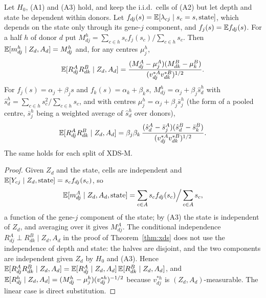 \begin{lemma}\label{lem:coupling}
Let $H_0$, (A1) and (A3) hold, and keep the i.i.d.\ cells of (A2) but let depth and state be dependent within donors. Let $f_{dj}(s)=\mathbb{E}[\lambda_{cj}\mid s_c=s,\text{state}]$, which depends on the state only through its gene-$j$ component, and $f_j(s)=\mathbb{E} f_{dj}(s)$. For a half $h$ of donor $d$ put $M^h_{dj}=\sum_{c\in h}s_cf_j(s_c)/\sum_{c\in h}s_c$. Then $\mathbb{E}[m^h_{dj}\mid Z_d,A_d]=M^h_{dj}$ and, for any centres $\mu^h_j$,
\[\mathbb{E}[R^A_{dj}R^B_{dk}\mid Z_d,A_d]=\frac{(M^A_{dj}-\mu^A_j)(M^B_{dk}-\mu^B_k)}{(v^{*A}_{dj}v^{*B}_{dk})^{1/2}}.\]
For $f_j(s)=\alpha_j+\beta_js$ and $f_k(s)=\alpha_k+\beta_ks$, $M^h_{dj}=\alpha_j+\beta_j\hat s^h_d$ with $\hat s^h_d=\sum_{c\in h}s_c^2/\sum_{c\in h}s_c$, and with centres $\mu^h_j=\alpha_j+\beta_j\bar s^h_j$ (the form of a pooled centre, $\bar s^h_j$ being a weighted average of $\hat s^h_d$ over donors),
\[\mathbb{E}[R^A_{dj}R^B_{dk}\mid Z_d,A_d]=\beta_j\beta_k\,\frac{(\hat s^A_d-\bar s^A_j)(\hat s^B_d-\bar s^B_k)}{(v^{*A}_{dj}v^{*B}_{dk})^{1/2}}.\]
The same holds for each split of XDS-M.
\end{lemma}
\begin{proof}
Given $Z_d$ and the state, cells are independent and $\mathbb{E}[Y_{cj}\mid Z_d,\text{state}]=s_cf_{dj}(s_c)$, so
\[\mathbb{E}[m^A_{dj}\mid Z_d,A_d,\text{state}]=\sum_{c\in A}s_cf_{dj}(s_c)\Big/\sum_{c\in A}s_c,\]
a function of the gene-$j$ component of the state; by (A3) the state is independent of $Z_d$, and averaging over it gives $M^A_{dj}$. The conditional independence $R^A_{dj}\perp R^B_{dk}\mid Z_d,A_d$ in the proof of Theorem~\ref{thm:xds} does not use the independence of depth and state: the halves are disjoint, and the two components are independent given $Z_d$ by $H_0$ and (A3). Hence $\mathbb{E}[R^A_{dj}R^B_{dk}\mid Z_d,A_d]=\mathbb{E}[R^A_{dj}\mid Z_d,A_d]\,\mathbb{E}[R^B_{dk}\mid Z_d,A_d]$, and $\mathbb{E}[R^h_{dj}\mid Z_d,A_d]=(M^h_{dj}-\mu^h_j)(v^{*h}_{dj})^{-1/2}$ because $v^{*h}_{dj}$ is $(Z_d,A_d)$-measurable. The linear case is direct substitution.
\end{proof}

